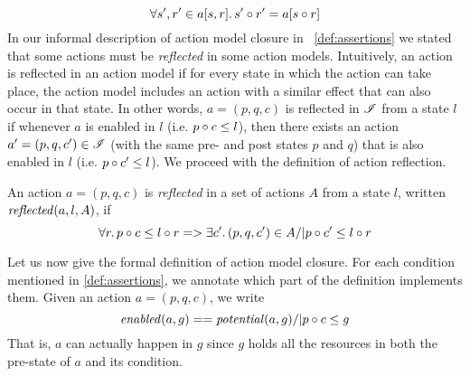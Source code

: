 %
\[
	\forall s', r' \in a[s, r] .\, s' \circ r' = a[s\circ r]
\]
%
In our informal description of action model closure in ~\ref{def:assertions} we stated that some actions must be \emph{reflected} in some action models. 
Intuitively, an action is reflected in an action model if for every state in which the action can take place, the action model includes an action with a similar effect that can also occur in that state. In other words, $a = (p, q, c)$ is reflected in $\mathscr{I}$ from a state $l$ if whenever $a$ is enabled in $l$ (i.e. $p \circ c \leq l$), then there exists an action $a' = (p, q, c') \in \mathscr{I}$ (with the same pre- and post states $p$ and $q$) that is also enabled in $l$ (i.e. $p \circ c' \leq l$). 
We proceed with the definition of action reflection.
%
%
\begin{definition}
An action $a = (p, q, c)$ is \emph{reflected} in a set of actions $A$ from a state $l$, written $\mathit{reflected}(a,l,A)$, if
%
\[
  \forall r.\, p \circ c \leq l \circ r =>
  \exists c'.\, (p, q, c') \in A /| p \circ c' \leq l\circ r
\]
\end{definition}
%
%
Let us now give the formal definition of action model closure. For each condition mentioned in \ref{def:assertions}, we annotate which part of the definition implements them. Given an action $a = (p, q, c)$, we write
%
\[
\mathit{enabled}(a,g) == \mathit{potential}(a,g) /| p \circ c \leq g
\]
%
That is, $a$ can actually happen in $g$ since $g$ holds all the resources in both the pre-state of $a$ and its condition.
%
%
